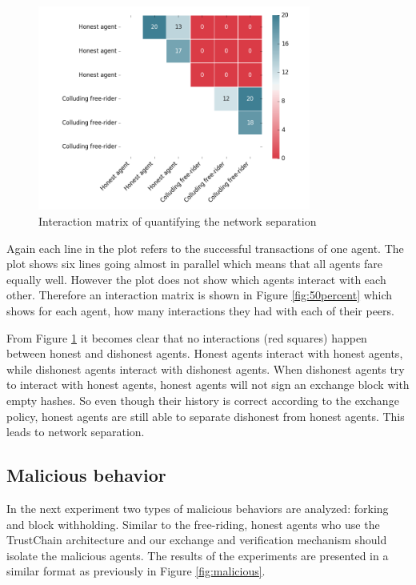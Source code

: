 \begin{figure}[h!]
    \centering
    \includegraphics[width=0.8\textwidth]{images/50percent_interaction_matrix}
    \caption{Interaction matrix of quantifying the network separation}
    \label{fig:50percent_matrix}
\end{figure}

Again each line in the plot refers to the successful transactions of one agent. The plot shows six 
lines going almost in parallel which means that all agents fare equally well. However the plot does
not show which agents interact with each other. Therefore an interaction matrix is shown in Figure 
\ref{fig:50percent} which shows for each agent, how many interactions they had with each of their 
peers. 

From Figure \ref{fig:50percent_matrix} it becomes clear that no interactions (red squares) happen 
between honest and dishonest agents. Honest agents interact with honest agents, while dishonest
agents interact with dishonest agents. When dishonest agents try to interact with honest agents, 
honest agents will not sign an exchange block with empty hashes. So even though their history is 
correct according to the exchange policy, honest agents are still able to separate dishonest from
honest agents. This leads to network separation.

\subsection{Malicious behavior}
In the next experiment two types of malicious behaviors are analyzed: forking and block withholding. 
Similar to the free-riding, honest agents who use the TrustChain architecture and our exchange and 
verification mechanism should isolate the malicious agents. The results of the experiments are 
presented in a similar format as previously in Figure \ref{fig:malicious}.

